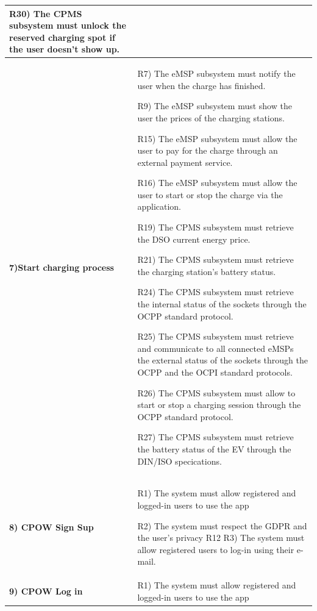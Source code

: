 \documentclass[table, 12pt]{article} %
\begin{document}
\begin{itemize}
\begin{longtable}{|p{}|p{}|}
                    R30) The CPMS subsystem must unlock the reserved charging spot if the user doesn't show up.
                    \\\hline


                    \cellcolor{SpringGreen!50}\textbf{7)Start charging process}\centering & 
                    R7) The eMSP subsystem must notify the user when the charge has finished.

                    R9) The eMSP subsystem must show the user the prices of the charging stations.

                    R15) The eMSP subsystem must allow the user to pay for the charge through an external payment service.

                    R16) The eMSP subsystem must allow the user to start or stop the charge via the application.

                    R19) The CPMS subsystem must retrieve the DSO current energy price.

                    R21) The CPMS subsystem must retrieve the charging station's battery status.

                    R24) The CPMS subsystem must retrieve the internal status of the sockets through the OCPP standard protocol.

                    R25) The CPMS subsystem must retrieve and communicate to all connected eMSPs the external status of the sockets through the OCPP and the OCPI standard protocols.

                    R26) The CPMS subsystem must allow to start or stop a charging session through the OCPP standard protocol.
                    
                    R27) The CPMS subsystem must retrieve the battery status of the EV through the DIN/ISO specications.
                    \\\hline



                    \cellcolor{SpringGreen!50}\textbf{8) CPOW Sign Sup}\centering & 
                    R1) The system must allow registered and logged-in users to use the app

                    R2) The system must respect the GDPR and the user's privacy
R12
                    R3) The system must allow registered users to log-in using their e-mail.
                    \\\hline
                    
                    \cellcolor{SpringGreen!50}\textbf{9) CPOW Log in}\centering & 
                    R1) The system must allow registered and logged-in users to use the app


\end{longtable}
\end{itemize}
\end{document}
